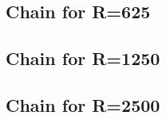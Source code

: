 \subsection{Chain for R=625} %
\label{sec:filter_frequency_responses:chain625}

\subsection{Chain for R=1250} %
\label{sec:filter_frequency_responses:chain1250}

\subsection{Chain for R=2500} %
\label{sec:filter_frequency_responses:chain2500}




